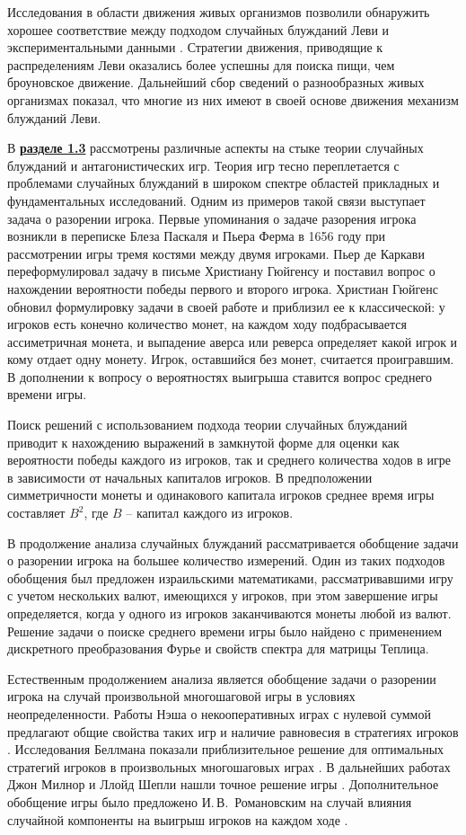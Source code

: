 Исследования в области движения живых организмов позволили обнаружить хорошее соответствие между подходом случайных блужданий Леви и экспериментальными данными \cite{shlesinger_levy_1986}. Стратегии движения, приводящие к распределениям Леви оказались более успешны для поиска пищи, чем броуновское движение. Дальнейший сбор сведений о разнообразных живых организмах показал, что многие из них имеют в своей основе движения механизм блужданий Леви.

В \underline{\textbf{разделе 1.3}} рассмотрены различные аспекты на стыке теории случайных блужданий и антагонистических игр. Теория игр тесно переплетается с проблемами случайных блужданий в широком спектре областей прикладных и фундаментальных исследований. Одним из примеров такой связи выступает задача о разорении игрока. Первые упоминания о задаче разорения игрока возникли в переписке Блеза Паскаля и Пьера Ферма в 1656 году при рассмотрении игры тремя костями между двумя игроками. Пьер де Каркави переформулировал задачу в письме Христиану Гюйгенсу и поставил вопрос о нахождении вероятности победы первого и второго игрока. Христиан Гюйгенс обновил формулировку задачи в своей работе и приблизил ее к классической: у игроков есть конечно количество монет, на каждом ходу подбрасывается ассиметричная монета, и выпадение аверса или реверса определяет какой игрок и кому отдает одну монету. Игрок, оставшийся без монет, считается проигравшим. В дополнении к вопросу о вероятностях выигрыша ставится вопрос среднего времени игры.

Поиск решений с использованием подхода теории случайных блужданий приводит к нахождению выражений в замкнутой форме для оценки как вероятности победы каждого из игроков, так и среднего количества ходов в игре в зависимости от начальных капиталов игроков. В предположении симметричности монеты и одинакового капитала игроков среднее время игры составляет $B^2$, где $B$ -- капитал каждого из игроков.

В продолжение анализа случайных блужданий рассматривается обобщение задачи о разорении игрока на большее количество измерений. Один из таких подходов обобщения был предложен израильскими математиками, рассматривавшими игру с учетом нескольких валют, имеющихся у игроков, при этом завершение игры определяется, когда у одного из игроков заканчиваются монеты любой из валют. Решение задачи о поиске среднего времени игры было найдено с применением дискретного преобразования Фурье и свойств спектра для матрицы Теплица. 

Естественным продолжением анализа является обобщение задачи о разорении игрока на случай произвольной многошаговой игры в условиях неопределенности. Работы Нэша о некооперативных играх с нулевой суммой предлагают общие свойства таких игр и наличие равновесия в стратегиях игроков \cite{nash_non-cooperative_1951}. Исследования Беллмана показали приблизительное решение для оптимальных стратегий игроков в произвольных многошаговых играх \cite{bellman_decision-making_1954}. В дальнейших работах Джон Милнор и Ллойд Шепли нашли точное решение игры \cite{milnor_games_1956}. Дополнительное обобщение игры было предложено И.\,В.~Романовским на случай влияния случайной компоненты на выигрыш игроков на каждом ходе \cite{romanovsky_1961}. 

